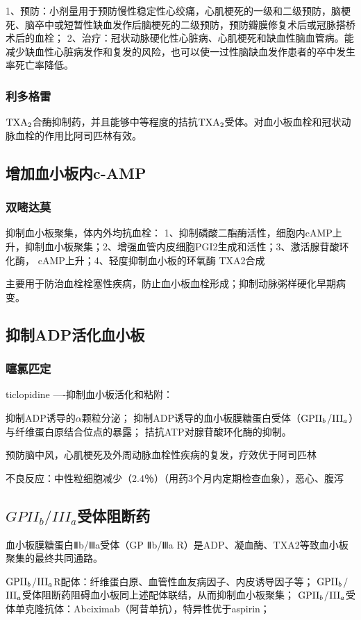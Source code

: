 \documentclass[UTF8]{ctexbook}
\begin{document}
1、预防：小剂量用于预防慢性稳定性心绞痛，心肌梗死的一级和二级预防，脑梗死、脑卒中或短暂性缺血发作后脑梗死的二级预防，预防瓣膜修复术后或冠脉搭桥术后的血栓；
2、治疗：冠状动脉硬化性心脏病、心肌梗死和缺血性脑血管病。能减少缺血性心脏病发作和复发的风险，也可以使一过性脑缺血发作患者的卒中发生率死亡率降低。
\subsubsection{利多格雷}
\(\textup{TXA}_{2}\)合酶抑制药，并且能够中等程度的拮抗\(\textup{TXA}_{2}\)受体。对血小板血栓和冠状动脉血栓的作用比阿司匹林有效。
\subsection{增加血小板内c-AMP}
\subsubsection{双嘧达莫}
抑制血小板聚集，体内外均抗血栓：
1、抑制磷酸二酯酶活性，细胞内cAMP上升，抑制血小板聚集；2、增强血管内皮细胞PGI2生成和活性；3、激活腺苷酸环化酶， cAMP上升；4、轻度抑制血小板的环氧酶 TXA2合成

主要用于防治血栓栓塞性疾病，防止血小板血栓形成；抑制动脉粥样硬化早期病变。
\subsection{抑制ADP活化血小板}
\subsubsection{噻氯匹定}
ticlopidine ----抑制血小板活化和粘附：

抑制ADP诱导的\(\alpha\)颗粒分泌；
抑制ADP诱导的血小板膜糖蛋白受体（\(\textup{GPII}_{b}\)/\(\textup{III}_{a}\)）与纤维蛋白原结合位点的暴露；
拮抗ATP对腺苷酸环化酶的抑制。

预防脑中风，心肌梗死及外周动脉血栓性疾病的复发，疗效优于阿司匹林

不良反应：中性粒细胞减少（2.4％）（用药3个月内定期检查血象），恶心、腹泻
\subsection{\(GPII_{b}/III_{a}\)受体阻断药}
血小板膜糖蛋白Ⅱb/Ⅲa受体（GP Ⅱb/Ⅲa R）是ADP、凝血酶、TXA2等致血小板聚集的最终共同通路。

\(\textup{GPII}_{b}\)/\(\textup{III}_{a}\)R配体：纤维蛋白原、血管性血友病因子、内皮诱导因子等；
\(\textup{GPII}_{b}\)/\(\textup{III}_{a}\)受体阻断药阻碍血小板同上述配体联结，从而抑制血小板聚集；
\(\textup{GPII}_{b}\)/\(\textup{III}_{a}\)受体单克隆抗体：Abciximab（阿昔单抗），特异性优于aspirin；
\end{document}
